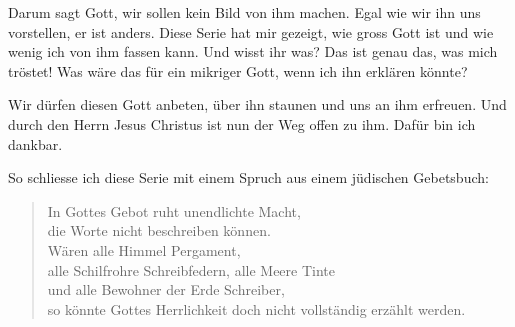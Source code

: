 Darum sagt Gott, wir sollen kein Bild von ihm machen. Egal wie wir ihn uns vorstellen, er ist anders. Diese Serie hat mir gezeigt, wie gross Gott ist und wie wenig ich von ihm fassen kann. Und wisst ihr was? Das ist genau das, was mich tröstet! Was wäre das für ein mikriger Gott, wenn ich ihn erklären könnte? 

Wir dürfen diesen Gott anbeten, über ihn staunen und uns an ihm erfreuen. Und durch den Herrn Jesus Christus ist nun der Weg offen zu ihm. Dafür bin ich dankbar.

So schliesse ich diese Serie mit einem Spruch aus einem jüdischen Gebetsbuch:
\begin{quote}
    In Gottes Gebot ruht unendlichte Macht,\\
    die Worte nicht beschreiben können.\\
    Wären alle Himmel Pergament,\\
    alle Schilfrohre Schreibfedern, alle Meere Tinte\\
    und alle Bewohner der Erde Schreiber,\\
    so könnte Gottes Herrlichkeit doch nicht vollständig erzählt werden.
\end{quote}

